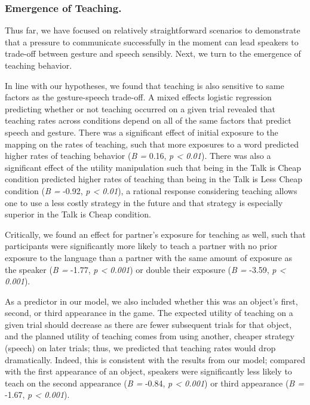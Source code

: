 \documentclass[10pt, letterpaper]{article}
\begin{document}
\hypertarget{emergence-of-teaching.}{%
\subsubsection{Emergence of Teaching.}\label{emergence-of-teaching.}}

Thus far, we have focused on relatively straightforward scenarios to
demonstrate that a pressure to communicate successfully in the moment
can lead speakers to trade-off between gesture and speech sensibly.
Next, we turn to the emergence of teaching behavior.

In line with our hypotheses, we found that teaching is also sensitive to
same factors as the gesture-speech trade-off. A mixed effects logistic
regression predicting whether or not teaching occurred on a given trial
revealed that teaching rates across conditions depend on all of the same
factors that predict speech and gesture. There was a significant effect
of initial exposure to the mapping on the rates of teaching, such that
more exposures to a word predicted higher rates of teaching behavior
(\emph{B =} 0.16, \emph{p \textless{} 0.01}). There was also a
significant effect of the utility manipulation such that being in the
Talk is Cheap condition predicted higher rates of teaching than being in
the Talk is Less Cheap condition (\emph{B =} -0.92, \emph{p \textless{}
0.01}), a rational response considering teaching allows one to use a
less costly strategy in the future and that strategy is especially
superior in the Talk is Cheap condition.

Critically, we found an effect for partner's exposure for teaching as
well, such that participants were significantly more likely to teach a
partner with no prior exposure to the language than a partner with the
same amount of exposure as the speaker (\emph{B =} -1.77, \emph{p
\textless{} 0.001}) or double their exposure (\emph{B =} -3.59, \emph{p
\textless{} 0.001}).

As a predictor in our model, we also included whether this was an
object's first, second, or third appearance in the game. The expected
utility of teaching on a given trial should decrease as there are fewer
subsequent trials for that object, and the planned utility of teaching
comes from using another, cheaper strategy (speech) on later trials;
thus, we predicted that teaching rates would drop dramatically. Indeed,
this is consistent with the results from our model; compared with the
first appearance of an object, speakers were significantly less likely
to teach on the second appearance (\emph{B =} -0.84, \emph{p \textless{}
0.001}) or third appearance (\emph{B =} -1.67, \emph{p \textless{}
0.001}).
\end{document}
